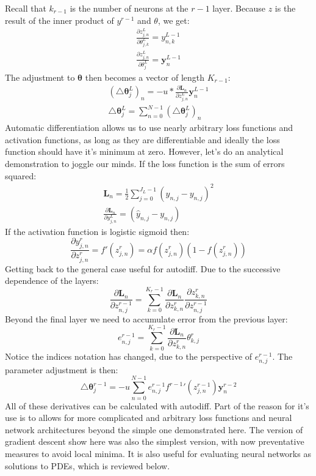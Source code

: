 \documentclass[]{article}
\begin{document}
Recall that $k_{r-1}$ is the number of neurons at the $r-1$ layer.  Because $z$ is the result of the inner product of $y^{r-1}$ and $\theta$, we get:
\begin{gather}
\frac{\partial z^L_{j,n}}{\partial \theta^L_{j,k}} = y^{L-1}_{n,k}\\
\frac{\partial z^L_{j,n}}{\partial \theta^L_j} = \textbf{y}^{L-1}_n
\end{gather}
The adjustment to $\boldsymbol{\theta}$ then becomes a vector of length $K_{r-1}$:
\begin{gather}
(\triangle\boldsymbol{\theta}^L_j)_n = - u*\frac{\partial \textbf{L}_n}{\partial z^L_{j,n}} \textbf{y}^{L-1}_n\\
\triangle\boldsymbol{\theta}^L_j = \sum_{n=0}^{N-1}(\triangle\boldsymbol{\theta}^L_j)_n
\end{gather}
Automatic differentiation allows us to use nearly arbitrary loss functions and activation functions, as long as they are differentiable and ideally the loss function should have it's minimum at zero.  However, let's do an analytical demonstration to joggle our minds.  If the loss function is the sum of errors squared:
\begin{gather}
\textbf{L}_n = \frac{1}{2} \sum_{j=0}^{J_L -1} (\hat{y}_{n,j} - y_{n,j})^2 \\
\frac{\partial \textbf{L}_n}{\partial y^L_{j,n}} = (\hat{y}_{n,j} - y_{n,j})
\end{gather}
If the activation function is logistic sigmoid then:
\begin{equation} 
\frac{\partial y^r_{j,n}}{\partial z^r_{j,n}} = f'(z^r_{j,n}) = \alpha f(z^r_{j,n})(1 - f(z^r_{j,n}))
\end{equation}
Getting back to the general case useful for autodiff.  Due to the successive dependence of the layers: 
\begin{equation} 
\frac{\partial \textbf{L}_n}{\partial z^{r-1}_{n, j}} =  \sum_{k=0}^{K_r - 1}\frac{\partial \textbf{L}_n}{\partial z^r_{k,n}} \frac{\partial z^r_{k,n}}{{\partial z^{r-1}_{n, j}}}
\end{equation}
Beyond the final layer we need to accumulate error from the previous layer: 
\begin{equation} 
e^{r-1}_{n,j} = \sum_{k=0}^{K_r - 1} \frac{\partial \textbf{L}_n}{\partial z^r_{k,n}} \theta^r_{k,j}
\end{equation}
Notice the indices notation has changed, due to the perspective of $e^{r-1}_{n,j}$.  The parameter adjustment is then:
\begin{equation}
\triangle\boldsymbol{\theta}^{r-1}_j = - u\sum_{n=0}^{N-1} e^{r-1}_{n,j} {f^{r-1}}'(z^{r-1}_{j,n}) \textbf{y}^{r-2}_n
\end{equation}
All of these derivatives can be calculated with autodiff.  Part of the reason for it's use is to allows for more complicated and arbitrary loss functions and neural network architectures beyond the simple one demonstrated here.  The version of gradient descent show here was also the simplest version, with now preventative measures to avoid local minima.  It is also useful for evaluating neural networks as solutions to PDEs, which is reviewed below. 
\end{document}
